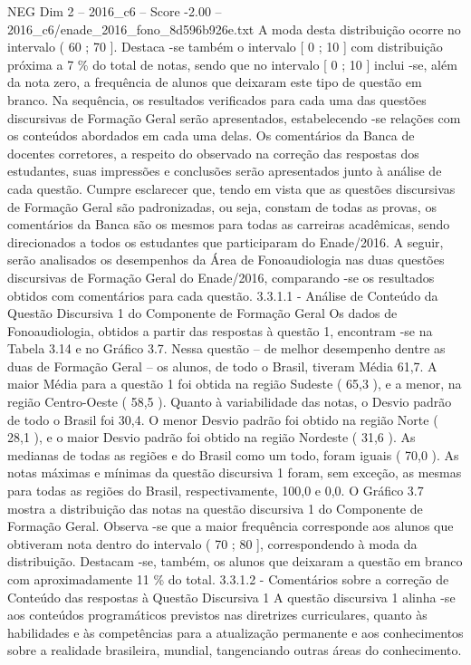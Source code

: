\begin{textsample}{NEG Dim 2 – 2016\_c6 – Score -2.00 – 2016\_c6/enade\_2016\_fono\_8d596b926e.txt}
A moda desta distribuição ocorre no intervalo ( 60 ; 70 ].
Destaca -se também o intervalo [ 0 ; 10 ] com distribuição próxima a 7 \% do total de notas, sendo que no intervalo [ 0 ; 10 ] inclui -se, além da nota zero, a frequência de alunos que deixaram este tipo de questão em branco.
Na sequência, os resultados verificados para cada uma das questões discursivas de Formação Geral serão apresentados, estabelecendo -se relações com os conteúdos abordados em cada uma delas.
Os comentários da Banca de docentes corretores, a respeito do observado na correção das respostas dos estudantes, suas impressões e conclusões serão apresentados junto à análise de cada questão.
Cumpre esclarecer que, tendo em vista que as questões discursivas de Formação Geral são padronizadas, ou seja, constam de todas as provas, os comentários da Banca são os mesmos para todas as carreiras acadêmicas, sendo direcionados a todos os estudantes que participaram do Enade/2016.
A seguir, serão analisados os desempenhos da Área de Fonoaudiologia nas duas questões discursivas de Formação Geral do Enade/2016, comparando -se os resultados obtidos com comentários para cada questão. 3.3.1.1 - Análise de Conteúdo da Questão Discursiva 1 do Componente de Formação Geral Os dados de Fonoaudiologia, obtidos a partir das respostas à questão 1, encontram -se na Tabela 3.14 e no Gráfico 3.7.
Nessa questão – de melhor desempenho dentre as duas de Formação Geral – os alunos, de todo o Brasil, tiveram Média 61,7.
A maior Média para a questão 1 foi obtida na região Sudeste ( 65,3 ), e a menor, na região Centro-Oeste ( 58,5 ).
Quanto à variabilidade das notas, o Desvio padrão de todo o Brasil foi 30,4.
O menor Desvio padrão foi obtido na região Norte ( 28,1 ), e o maior Desvio padrão foi obtido na região Nordeste ( 31,6 ).
As medianas de todas as regiões e do Brasil como um todo, foram iguais ( 70,0 ).
As notas máximas e mínimas da questão discursiva 1 foram, sem exceção, as mesmas para todas as regiões do Brasil, respectivamente, 100,0 e 0,0.
O Gráfico 3.7 mostra a distribuição das notas na questão discursiva 1 do Componente de Formação Geral.
Observa -se que a maior frequência corresponde aos alunos que obtiveram nota dentro do intervalo ( 70 ; 80 ], correspondendo à moda da distribuição.
Destacam -se, também, os alunos que deixaram a questão em branco com aproximadamente 11 \% do total. 3.3.1.2 - Comentários sobre a correção de Conteúdo das respostas à Questão Discursiva 1 A questão discursiva 1 alinha -se aos conteúdos programáticos previstos nas diretrizes curriculares, quanto às habilidades e às competências para a atualização permanente e aos conhecimentos sobre a realidade brasileira, mundial, tangenciando outras áreas do conhecimento.

\end{textsample}
